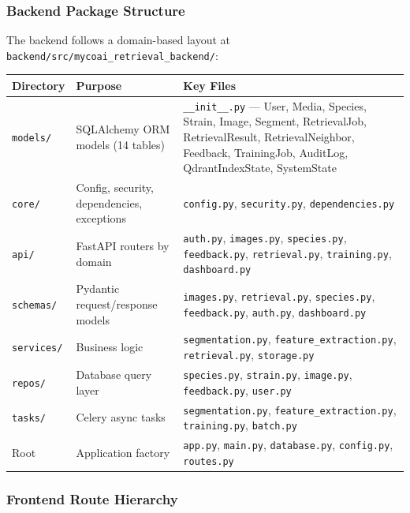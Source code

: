 \subsubsection{Backend Package Structure}\label{backend-package-structure}

The backend follows a domain-based layout at \texttt{backend/src/mycoai\_retrieval\_backend/}:

\begin{center}
\begin{tabular}{@{}p{3cm} p{4.5cm} p{6.5cm}@{}}
\toprule
\textbf{Directory} & \textbf{Purpose} & \textbf{Key Files} \\
\midrule
\texttt{models/} & SQLAlchemy ORM models (14 tables) & \texttt{\_\_init\_\_.py} --- User, Media, Species, Strain, Image, Segment, RetrievalJob, RetrievalResult, RetrievalNeighbor, Feedback, TrainingJob, AuditLog, QdrantIndexState, SystemState \\
\texttt{core/} & Config, security, dependencies, exceptions & \texttt{config.py}, \texttt{security.py}, \texttt{dependencies.py} \\
\texttt{api/} & FastAPI routers by domain & \texttt{auth.py}, \texttt{images.py}, \texttt{species.py}, \texttt{feedback.py}, \texttt{retrieval.py}, \texttt{training.py}, \texttt{dashboard.py} \\
\texttt{schemas/} & Pydantic request/response models & \texttt{images.py}, \texttt{retrieval.py}, \texttt{species.py}, \texttt{feedback.py}, \texttt{auth.py}, \texttt{dashboard.py} \\
\texttt{services/} & Business logic & \texttt{segmentation.py}, \texttt{feature\_extraction.py}, \texttt{retrieval.py}, \texttt{storage.py} \\
\texttt{repos/} & Database query layer & \texttt{species.py}, \texttt{strain.py}, \texttt{image.py}, \texttt{feedback.py}, \texttt{user.py} \\
\texttt{tasks/} & Celery async tasks & \texttt{segmentation.py}, \texttt{feature\_extraction.py}, \texttt{training.py}, \texttt{batch.py} \\
Root & Application factory & \texttt{app.py}, \texttt{main.py}, \texttt{database.py}, \texttt{config.py}, \texttt{routes.py} \\
\bottomrule
\end{tabular}
\end{center}

\subsubsection{Frontend Route Hierarchy}\label{frontend-route-hierarchy}

